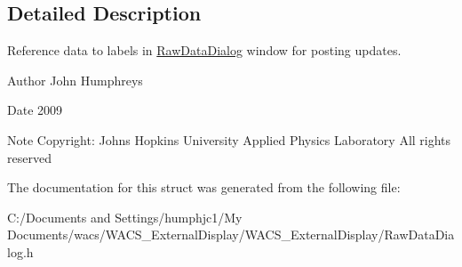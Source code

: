 \subsection{Detailed Description}
Reference data to labels in \hyperlink{class_raw_data_dialog}{RawDataDialog} window for posting updates. 

\begin{DoxyAuthor}{Author}
John Humphreys 
\end{DoxyAuthor}
\begin{DoxyDate}{Date}
2009 
\end{DoxyDate}
\begin{DoxyNote}{Note}
Copyright: Johns Hopkins University Applied Physics Laboratory All rights reserved 
\end{DoxyNote}


The documentation for this struct was generated from the following file:\begin{DoxyCompactItemize}
\item 
C:/Documents and Settings/humphjc1/My Documents/wacs/WACS\_\-ExternalDisplay/WACS\_\-ExternalDisplay/RawDataDialog.h\end{DoxyCompactItemize}
